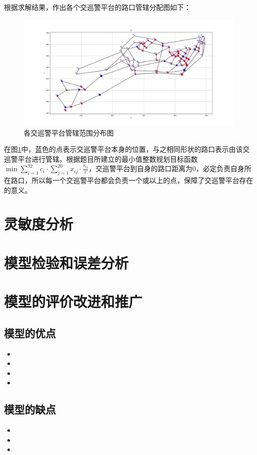 \documentclass[withoutpreface,bwprint]{cumcmthesis} %
\begin{document}
	根据求解结果，作出各个交巡警平台的路口管辖分配图如下：
	\begin{figure}[htb]
		\centering
		\includegraphics[width=1\linewidth]{警局管理范围图}
		\caption{各交巡警平台管辖范围分布图}
		\label{fig:各交巡警平台管辖范围分布图}
	\end{figure}

	在图\ref{fig:各交巡警平台管辖范围分布图}中，蓝色的点表示交巡警平台本身的位置，与之相同形状的路口表示由该交巡警平台进行管辖。根据题目所建立的最小值整数规划目标函数$\min \sum_{i=1}^{92} c_i \cdot \sum_{j=1}^{20} x_{i j} \cdot \frac{s_{i j}}{v}$，交巡警平台到自身的路口距离为0，必定负责自身所在路口，所以每一个交巡警平台都会负责一个或以上的点，保障了交巡警平台存在的意义。
	
	
	\section{灵敏度分析}
	
	\section{模型检验和误差分析}
	
	\section{模型的评价改进和推广}
	\subsection{模型的优点}
	\begin{itemize}
		\item 
		\item 
		\item 
		\item 
	\end{itemize}
	\subsection{模型的缺点}
	\begin{itemize}
		\item 
		\item 
		\item 
	\end{itemize}
\end{document}
